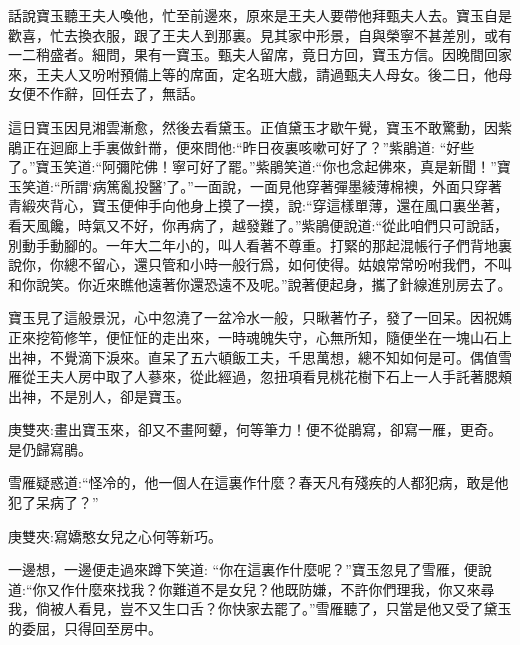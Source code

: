 

\begin{parag}
    話說寶玉聽王夫人喚他，忙至前邊來，原來是王夫人要帶他拜甄夫人去。寶玉自是歡喜，忙去換衣服，跟了王夫人到那裏。見其家中形景，自與榮寧不甚差別，或有一二稍盛者。細問，果有一寶玉。甄夫人留席，竟日方回，寶玉方信。因晚間回家來，王夫人又吩咐預備上等的席面，定名班大戲，請過甄夫人母女。後二日，他母女便不作辭，回任去了，無話。
\end{parag}


\begin{parag}
    這日寶玉因見湘雲漸愈，然後去看黛玉。正值黛玉才歇午覺，寶玉不敢驚動，因紫鵑正在迴廊上手裏做針黹，便來問他:“昨日夜裏咳嗽可好了？”紫鵑道: “好些了。”寶玉笑道:“阿彌陀佛！寧可好了罷。”紫鵑笑道:“你也念起佛來，真是新聞！”寶玉笑道:“所謂‘病篤亂投醫’了。”一面說，一面見他穿著彈墨綾薄棉襖，外面只穿著青緞夾背心，寶玉便伸手向他身上摸了一摸，說:“穿這樣單薄，還在風口裏坐著，看天風饞，時氣又不好，你再病了，越發難了。”紫鵑便說道:“從此咱們只可說話，別動手動腳的。一年大二年小的，叫人看著不尊重。打緊的那起混帳行子們背地裏說你，你總不留心，還只管和小時一般行爲，如何使得。姑娘常常吩咐我們，不叫和你說笑。你近來瞧他遠著你還恐遠不及呢。”說著便起身，攜了針線進別房去了。
\end{parag}


\begin{parag}
    寶玉見了這般景況，心中忽澆了一盆冷水一般，只瞅著竹子，發了一回呆。因祝媽正來挖筍修竿，便怔怔的走出來，一時魂魄失守，心無所知，隨便坐在一塊山石上出神，不覺滴下淚來。直呆了五六頓飯工夫，千思萬想，總不知如何是可。偶值雪雁從王夫人房中取了人蔘來，從此經過，忽扭項看見桃花樹下石上一人手託著腮頰出神，不是別人，卻是寶玉。\begin{note}庚雙夾:畫出寶玉來，卻又不畫阿顰，何等筆力！便不從鵑寫，卻寫一雁，更奇。是仍歸寫鵑。\end{note}雪雁疑惑道:“怪冷的，他一個人在這裏作什麼？春天凡有殘疾的人都犯病，敢是他犯了呆病了？”\begin{note}庚雙夾:寫嬌憨女兒之心何等新巧。\end{note}一邊想，一邊便走過來蹲下笑道: “你在這裏作什麼呢？”寶玉忽見了雪雁，便說道:“你又作什麼來找我？你難道不是女兒？他既防嫌，不許你們理我，你又來尋我，倘被人看見，豈不又生口舌？你快家去罷了。”雪雁聽了，只當是他又受了黛玉的委屈，只得回至房中。
\end{parag}


